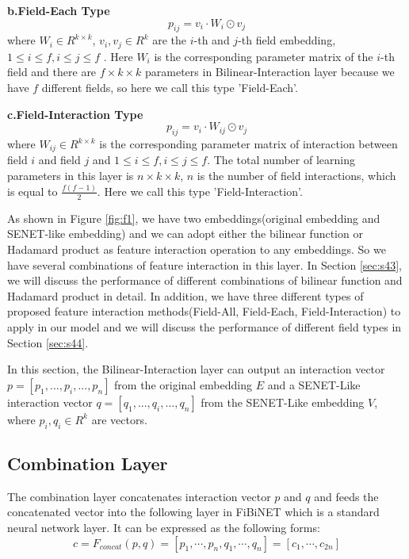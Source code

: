 \documentclass[sigconf]{acmart}
\begin{document}
\noindent\textbf{b.Field-Each Type}
\begin{equation}
p_{ij}=v_i \cdot W_i\odot v_j
\end{equation}
where \(W_i \in R^{k \times k}\), \(v_i, v_j \in R^k\) are the \(i\)-th
and \(j\)-th field embedding, \(1 \le i \le f,  i \le j \le f\) . Here
\(W_i\) is the corresponding parameter matrix of the \(i\)-th
field and there are \(f \times k \times k\) parameters in
Bilinear-Interaction layer because we have \(f\) different fields, so
here we call this type 'Field-Each'.

\noindent\textbf{c.Field-Interaction Type}
\begin{equation}
    p_{ij}=v_i \cdot W_{ij}\odot v_j
\end{equation}
where \(W_{ij} \in R^{k \times k}\) is the corresponding parameter matrix
of interaction between field \(i\) and field \(j\) and
\(1 \le i \le f,  i \le j \le f\). The total number of learning
parameters in this layer is \( n \times k \times k\), \(n\) is the
number of field interactions, which is equal to \(\frac{f(f-1)}{2}\).
Here we call this type 'Field-Interaction'.

As shown in Figure \ref{fig:f1}, we have two embeddings(original embedding and SENET-like embedding) and we can adopt either the bilinear function or Hadamard product as feature interaction operation to any embeddings. So we have several combinations of feature interaction in this layer. In Section \ref{sec:s43}, we will discuss the performance of different combinations of bilinear function and Hadamard product in detail. In addition, 
we have three different types of proposed feature interaction methods(Field-All, Field-Each, Field-Interaction) to apply in our model and we will discuss the performance of different field types in Section \ref{sec:s44}. 

In this section, the Bilinear-Interaction layer can output an
interaction vector \(p = [p_1, ..., p_i, ...,p_n]\) from the original
embedding \(E\) and a SENET-Like interaction vector
\(q = [q_1, ..., q_i, ...,q_n]\) from the SENET-Like embedding \(V\), where $p_i, q_i \in R^{k}$ are vectors.

\subsection{Combination Layer}
The combination layer concatenates interaction vector $p$ and $q$ and feeds the concatenated vector into the following layer in
FiBiNET which is a standard neural network layer. It can be expressed
as the following forms:
\begin{equation}
    c = F_{concat}(p,q)=[p_1,\cdots,p_n, q_1,\cdots,q_n]=[c_1,\cdots, c_{2n}]
\end{equation}
\end{document}
